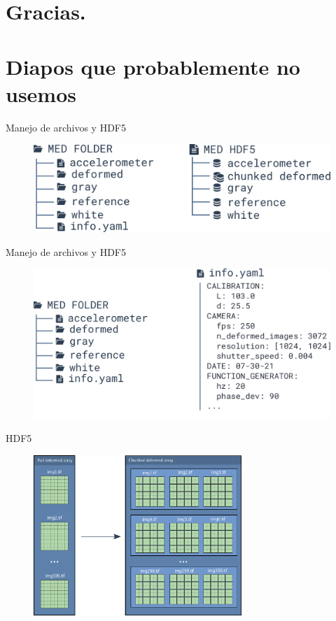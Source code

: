\documentclass[aspectratio=169]{beamer}
\begin{document}
\section*{Gracias.}

\section{Diapos que probablemente no usemos}

\begin{frame}{Manejo de archivos y HDF5}
	\begin{figure}[ht]
		\centering
		\includegraphics[width=1\textwidth]{figs/med_folder_to_hdf5.pdf}
	\end{figure}
\end{frame}

\begin{frame}{Manejo de archivos y HDF5}
	\begin{figure}[ht]
		\centering
		\includegraphics[width=1\textwidth]{figs/med_folder_infoyaml.pdf}
	\end{figure}
\end{frame}

\begin{frame}{HDF5}
	\begin{figure}[ht]
		\centering
		\includegraphics[width=0.7\textwidth]{figs/hdf5_chunk.pdf}
	\end{figure}
\end{frame}
\end{document}
